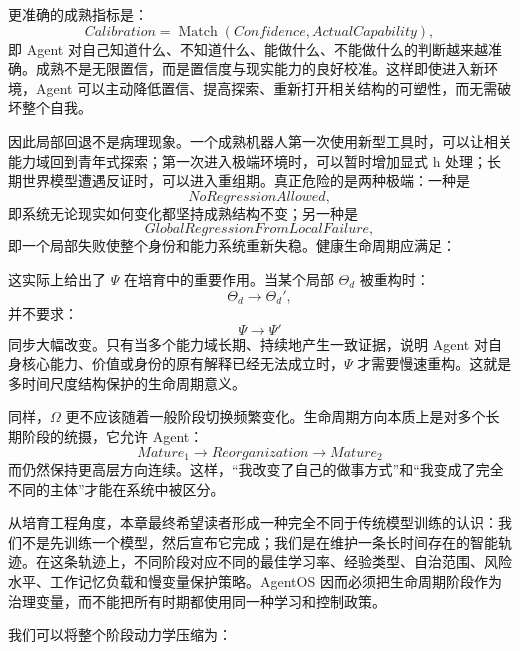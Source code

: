 更准确的成熟指标是：
\[
Calibration
=
\operatorname{Match}
(
Confidence,
ActualCapability
),
\]
即 Agent 对自己知道什么、不知道什么、能做什么、不能做什么的判断越来越准确。成熟不是无限置信，而是置信度与现实能力的良好校准。这样即使进入新环境，Agent 可以主动降低置信、提高探索、重新打开相关结构的可塑性，而无需破坏整个自我。

因此局部回退不是病理现象。一个成熟机器人第一次使用新型工具时，可以让相关能力域回到青年式探索；第一次进入极端环境时，可以暂时增加显式 h 处理；长期世界模型遭遇反证时，可以进入重组期。真正危险的是两种极端：一种是
\[
NoRegressionAllowed,
\]
即系统无论现实如何变化都坚持成熟结构不变；另一种是
\[
GlobalRegressionFromLocalFailure,
\]
即一个局部失败使整个身份和能力系统重新失稳。健康生命周期应满足：
\begin{statementbox}
\centering
{}
\end{statementbox}

这实际上给出了 $\Psi$ 在培育中的重要作用。当某个局部 $\Theta_d$ 被重构时：
\[
\Theta_d
\rightarrow
\Theta_d',
\]
并不要求：
\[
\Psi
\rightarrow
\Psi'
\]
同步大幅改变。只有当多个能力域长期、持续地产生一致证据，说明 Agent 对自身核心能力、价值或身份的原有解释已经无法成立时，$\Psi$ 才需要慢速重构。这就是多时间尺度结构保护的生命周期意义。

同样，$\Omega$ 更不应该随着一般阶段切换频繁变化。生命周期方向本质上是对多个长期阶段的统摄，它允许 Agent：
\[
Mature_1
\rightarrow
Reorganization
\rightarrow
Mature_2
\]
而仍然保持更高层方向连续。这样，“我改变了自己的做事方式”和“我变成了完全不同的主体”才能在系统中被区分。

从培育工程角度，本章最终希望读者形成一种完全不同于传统模型训练的认识：我们不是先训练一个模型，然后宣布它完成；我们是在维护一条长时间存在的智能轨迹。在这条轨迹上，不同阶段对应不同的最佳学习率、经验类型、自治范围、风险水平、工作记忆负载和慢变量保护策略。AgentOS 因而必须把生命周期阶段作为治理变量，而不能把所有时期都使用同一种学习和控制政策。

我们可以将整个阶段动力学压缩为：
\begin{statementbox}
\centering
{}
\end{statementbox}

